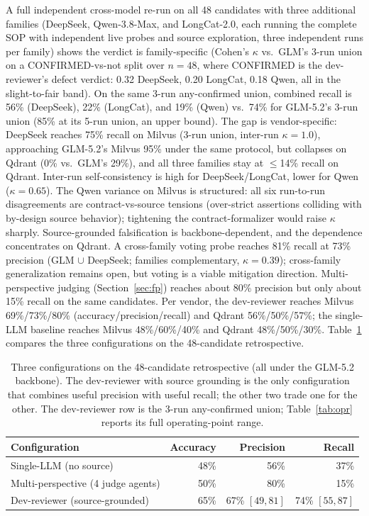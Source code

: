 \documentclass[sigconf]{acmart}
\begin{document}
A full independent cross-model re-run on all 48 candidates with three additional families (DeepSeek, Qwen-3.8-Max, and LongCat-2.0, each running the complete SOP with independent live probes and source exploration, three independent runs per family) shows the verdict is family-specific (Cohen's $\kappa$ vs.\ GLM's 3-run union on a CONFIRMED-vs-not split over $n{=}48$, where CONFIRMED is the dev-reviewer's defect verdict: 0.32 DeepSeek, 0.20 LongCat, 0.18 Qwen, all in the slight-to-fair band). On the same 3-run any-confirmed union, combined recall is 56\% (DeepSeek), 22\% (LongCat), and 19\% (Qwen) vs.\ 74\% for GLM-5.2's 3-run union (85\% at its 5-run union, an upper bound). The gap is vendor-specific: DeepSeek reaches 75\% recall on Milvus (3-run union, inter-run $\kappa = 1.0$), approaching GLM-5.2's Milvus 95\% under the same protocol, but collapses on Qdrant (0\% vs.\ GLM's 29\%), and all three families stay at $\leq$14\% recall on Qdrant. Inter-run self-consistency is high for DeepSeek/LongCat, lower for Qwen ($\kappa = 0.65$). The Qwen variance on Milvus is structured: all six run-to-run disagreements are contract-vs-source tensions (over-strict assertions colliding with by-design source behavior); tightening the contract-formalizer would raise $\kappa$ sharply. Source-grounded falsification is backbone-dependent, and the dependence concentrates on Qdrant. A cross-family voting probe reaches 81\% recall at 73\% precision (GLM $\cup$ DeepSeek; families complementary, $\kappa = 0.39$); cross-family generalization remains open, but voting is a viable mitigation direction. Multi-perspective judging (Section~\ref{sec:fp}) reaches about 80\% precision but only about 15\% recall on the same candidates. Per vendor, the dev-reviewer reaches Milvus 69\%/73\%/80\% (accuracy/precision/recall) and Qdrant 56\%/50\%/57\%; the single-LLM baseline reaches Milvus 48\%/60\%/40\% and Qdrant 48\%/50\%/30\%. Table~\ref{tab:configs} compares the three configurations on the 48-candidate retrospective.

\begin{table}[t]
\caption{Three configurations on the 48-candidate retrospective (all under the GLM-5.2 backbone). The dev-reviewer with source grounding is the only configuration that combines useful precision with useful recall; the other two trade one for the other. The dev-reviewer row is the 3-run any-confirmed union; Table~\ref{tab:opr} reports its full operating-point range.}
\label{tab:configs}
\small
\begin{tabular}{@{}lrrr@{}}
\toprule
Configuration & Accuracy & Precision & Recall \\
\midrule
Single-LLM (no source) & 48\% & 56\% & 37\% \\
Multi-perspective (4 judge agents) & 50\% & 80\% & 15\% \\
Dev-reviewer (source-grounded) & 65\% & 67\% $[49, 81]$ & 74\% $[55, 87]$ \\
\bottomrule
\end{tabular}
\end{table}
\end{document}
